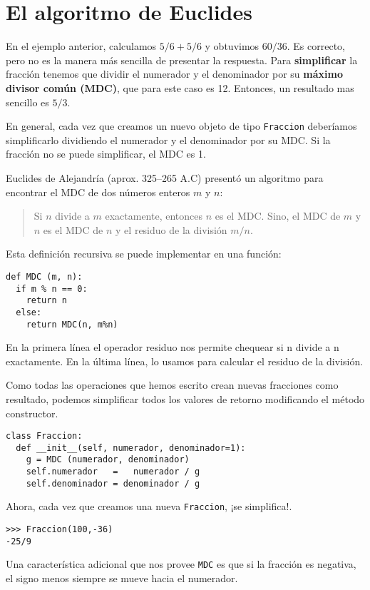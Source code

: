 \section{El algoritmo de Euclides}

  

En el ejemplo anterior, calculamos $5/6+5/6$ y obtuvimos $60/36$.
Es correcto, pero no es la manera más sencilla de presentar la respuesta.
Para \textbf{simplificar} la fracción tenemos que dividir el numerador
y el denominador por su \textbf{máximo divisor común (MDC)}, que para
este caso es 12. Entonces, un resultado mas sencillo es $5/3$.

En general, cada vez que creamos un nuevo objeto de tipo \texttt{Fraccion}
deberíamos simplificarlo dividiendo el numerador y el denominador
por su MDC. Si la fracción no se puede simplificar, el MDC es 1.

Euclides de Alejandría (aprox. 325–265 A.C) presentó un algoritmo
para encontrar el MDC de dos números enteros $m$ y $n$:
\begin{quote}
Si $n$ divide a $m$ exactamente, entonces $n$ es el MDC. Sino,
el MDC de $m$ y $n$ es el MDC de $n$ y el residuo de la división
$m/n$. 
\end{quote}
Esta definición recursiva se puede implementar en una función:

\begin{verbatim}
def MDC (m, n):
  if m % n == 0:
    return n
  else:
    return MDC(n, m%n)
\end{verbatim}
 En la primera línea el operador residuo nos permite chequear si n
divide a n exactamente. En la última línea, lo usamos para calcular
el residuo de la división.

Como todas las operaciones que hemos escrito crean nuevas fracciones
como resultado, podemos simplificar todos los valores de retorno modificando
el método constructor.

\begin{verbatim}
class Fraccion:
  def __init__(self, numerador, denominador=1):
    g = MDC (numerador, denominador)
    self.numerador   =   numerador / g
    self.denominador = denominador / g
\end{verbatim}
 Ahora, cada vez que creamos una nueva \texttt{Fraccion}, ¡se simplifica!.

\begin{verbatim}
>>> Fraccion(100,-36)
-25/9
\end{verbatim}
 Una característica adicional que nos provee \texttt{MDC} es que si
la fracción es negativa, el signo menos siempre se mueve hacia el
numerador.

